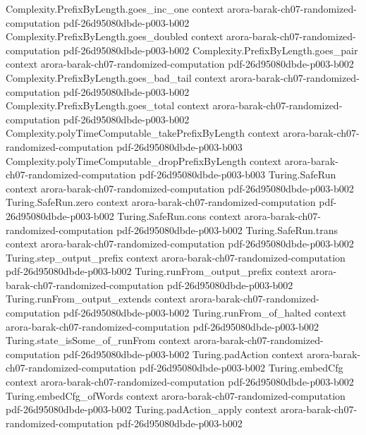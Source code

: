 \begin{theorem}
\proofstep
  {Complexity.PrefixByLength.goes_inc_one}
  {context}
  {arora-barak-ch07-randomized-computation}
  {pdf-26d95080dbde-p003-b002}
\proofstep
  {Complexity.PrefixByLength.goes_doubled}
  {context}
  {arora-barak-ch07-randomized-computation}
  {pdf-26d95080dbde-p003-b002}
\proofstep
  {Complexity.PrefixByLength.goes_pair}
  {context}
  {arora-barak-ch07-randomized-computation}
  {pdf-26d95080dbde-p003-b002}
\proofstep
  {Complexity.PrefixByLength.goes_bad_tail}
  {context}
  {arora-barak-ch07-randomized-computation}
  {pdf-26d95080dbde-p003-b002}
\proofstep
  {Complexity.PrefixByLength.goes_total}
  {context}
  {arora-barak-ch07-randomized-computation}
  {pdf-26d95080dbde-p003-b002}
\proofstep
  {Complexity.polyTimeComputable_takePrefixByLength}
  {context}
  {arora-barak-ch07-randomized-computation}
  {pdf-26d95080dbde-p003-b003}
\proofstep
  {Complexity.polyTimeComputable_dropPrefixByLength}
  {context}
  {arora-barak-ch07-randomized-computation}
  {pdf-26d95080dbde-p003-b003}
\proofstep
  {Turing.SafeRun}
  {context}
  {arora-barak-ch07-randomized-computation}
  {pdf-26d95080dbde-p003-b002}
\proofstep
  {Turing.SafeRun.zero}
  {context}
  {arora-barak-ch07-randomized-computation}
  {pdf-26d95080dbde-p003-b002}
\proofstep
  {Turing.SafeRun.cons}
  {context}
  {arora-barak-ch07-randomized-computation}
  {pdf-26d95080dbde-p003-b002}
\proofstep
  {Turing.SafeRun.trans}
  {context}
  {arora-barak-ch07-randomized-computation}
  {pdf-26d95080dbde-p003-b002}
\proofstep
  {Turing.step_output_prefix}
  {context}
  {arora-barak-ch07-randomized-computation}
  {pdf-26d95080dbde-p003-b002}
\proofstep
  {Turing.runFrom_output_prefix}
  {context}
  {arora-barak-ch07-randomized-computation}
  {pdf-26d95080dbde-p003-b002}
\proofstep
  {Turing.runFrom_output_extends}
  {context}
  {arora-barak-ch07-randomized-computation}
  {pdf-26d95080dbde-p003-b002}
\proofstep
  {Turing.runFrom_of_halted}
  {context}
  {arora-barak-ch07-randomized-computation}
  {pdf-26d95080dbde-p003-b002}
\proofstep
  {Turing.state_isSome_of_runFrom}
  {context}
  {arora-barak-ch07-randomized-computation}
  {pdf-26d95080dbde-p003-b002}
\proofstep
  {Turing.padAction}
  {context}
  {arora-barak-ch07-randomized-computation}
  {pdf-26d95080dbde-p003-b002}
\proofstep
  {Turing.embedCfg}
  {context}
  {arora-barak-ch07-randomized-computation}
  {pdf-26d95080dbde-p003-b002}
\proofstep
  {Turing.embedCfg_ofWords}
  {context}
  {arora-barak-ch07-randomized-computation}
  {pdf-26d95080dbde-p003-b002}
\proofstep
  {Turing.padAction_apply}
  {context}
  {arora-barak-ch07-randomized-computation}
  {pdf-26d95080dbde-p003-b002}

\end{theorem}
